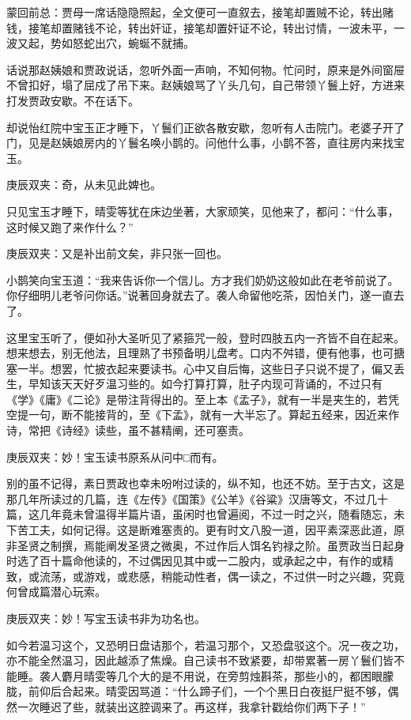 \begin{parag}
    \begin{note}蒙回前总：贾母一席话隐隐照起，全文便可一直叙去，接笔却置贼不论，转出赌钱，接笔却置赌钱不论，转出奸证，接笔却置奸证不论，转出讨情，一波未平，一波又起，势如怒蛇出穴，蜿蜒不就捕。\end{note}
\end{parag}


\begin{parag}
    话说那赵姨娘和贾政说话，忽听外面一声响，不知何物。忙问时，原来是外间窗屉不曾扣好，塌了屈戍了吊下来。赵姨娘骂了丫头几句，自己带领丫鬟上好，方进来打发贾政安歇。不在话下。
\end{parag}


\begin{parag}
    却说怡红院中宝玉正才睡下，丫鬟们正欲各散安歇，忽听有人击院门。老婆子开了门，见是赵姨娘房内的丫鬟名唤小鹊的。问他什么事，小鹊不答，直往房内来找宝玉。\begin{note}庚辰双夹：奇，从未见此婢也。\end{note}只见宝玉才睡下，晴雯等犹在床边坐著，大家顽笑，见他来了，都问：“什么事，这时候又跑了来作什么？”\begin{note}庚辰双夹：又是补出前文矣，非只张一回也。\end{note}小鹊笑向宝玉道：“我来告诉你一个信儿。方才我们奶奶这般如此在老爷前说了。你仔细明儿老爷问你话。”说著回身就去了。袭人命留他吃茶，因怕关门，遂一直去了。
\end{parag}


\begin{parag}
    这里宝玉听了，便如孙大圣听见了紧箍咒一般，登时四肢五内一齐皆不自在起来。想来想去，别无他法，且理熟了书预备明儿盘考。口内不舛错，便有他事，也可搪塞一半。想罢，忙披衣起来要读书。心中又自后悔，这些日子只说不提了，偏又丢生，早知该天天好歹温习些的。如今打算打算，肚子内现可背诵的，不过只有《学》《庸》《二论》是带注背得出的。至上本《孟子》，就有一半是夹生的，若凭空提一句，断不能接背的，至《下孟》，就有一大半忘了。算起五经来，因近来作诗，常把《诗经》读些，虽不甚精阐，还可塞责。\begin{note}庚辰双夹：妙！宝玉读书原系从问中□而有。\end{note}别的虽不记得，素日贾政也幸未吩咐过读的，纵不知，也还不妨。至于古文，这是那几年所读过的几篇，连《左传》《国策》《公羊》《谷粱》汉唐等文，不过几十篇，这几年竟未曾温得半篇片语，虽闲时也曾遍阅，不过一时之兴，随看随忘，未下苦工夫，如何记得。这是断难塞责的。更有时文八股一道，因平素深恶此道，原非圣贤之制撰，焉能阐发圣贤之微奥，不过作后人饵名钓禄之阶。虽贾政当日起身时选了百十篇命他读的，不过偶因见其中或一二股内，或承起之中，有作的或精致，或流荡，或游戏，或悲感，稍能动性者，偶一读之，不过供一时之兴趣，究竟何曾成篇潜心玩索。\begin{note}庚辰双夹：妙！写宝玉读书非为功名也。\end{note}如今若温习这个，又恐明日盘诘那个，若温习那个，又恐盘驳这个。况一夜之功，亦不能全然温习，因此越添了焦燥。自己读书不致紧要，却带累著一房丫鬟们皆不能睡。袭人麝月晴雯等几个大的是不用说，在旁剪烛斟茶，那些小的，都困眼朦胧，前仰后合起来。晴雯因骂道：“什么蹄子们，一个个黑日白夜挺尸挺不够，偶然一次睡迟了些，就装出这腔调来了。再这样，我拿针戳给你们两下子！”
\end{parag}


